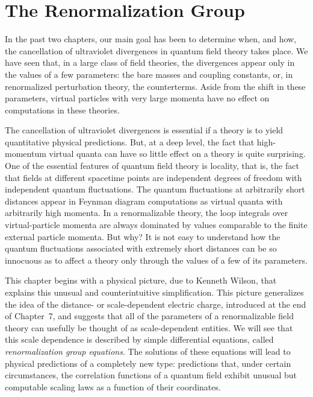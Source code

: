 \chapter{The Renormalization Group}

In the past two chapters, our main goal has been to determine when, and how,
the cancellation of ultraviolet divergences in quantum field theory takes
place.  We have seen that, in a large class of field theories, the divergences
appear only in the values of a few parameters: the bare masses and coupling
constants, or, in renormalized perturbation theory, the counterterms.  Aside
from the shift in these parameters, virtual particles with very large momenta
have no effect on computations in these theories.

The cancellation of ultraviolet divergences is essential if a theory is to yield
quantitative physical predictions.  But, at a deep level, the fact that
high-momentum virtual quanta can have so little effect on a theory is quite
surprising.  One of the essential features of quantum field theory is
locality, that is, the fact that fields at different spacetime points are
independent degrees of freedom with independent quantum fluctuations.  The
quantum fluctuations at arbitrarily short distances appear in Feynman diagram
computations as virtual quanta with arbitrarily high momenta.  In a
renormalizable theory, the loop integrals over virtual-particle momenta are
always dominated by values comparable to the finite external particle
momenta.  But why?  It is not easy to understand how the quantum fluctuations
associated with extremely short distances can be so innocuous as to affect a
theory only through the values of a few of its parameters.

This chapter begins with a physical picture, due to Kenneth Wilson, that
explains this unusual and counterintuitive simplification.  This picture
generalizes the idea of the distance- or scale-dependent electric charge,
introduced at the end of Chapter~7, and suggests that all of the parameters of
a renormalizable field theory can usefully be thought of as scale-dependent
entities.  We will see that this scale dependence is described by simple
differential equations, called \emph{renormalization group equations}.  The
solutions of these equations will lead to physical predictions of a completely
new type: predictions that, under certain circumstances, the correlation
functions of a quantum field exhibit unusual but computable scaling laws as a
function of their coordinates.

